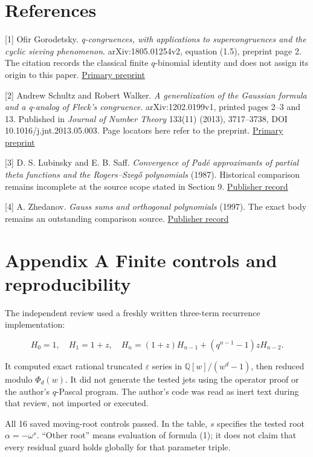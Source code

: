 \documentclass[
  11pt,
]{article}
\begin{document}
\section{References}\label{references}

{[}1{]} Ofir Gorodetsky. \emph{q-congruences, with applications to
supercongruences and the cyclic sieving phenomenon}. arXiv:1805.01254v2,
equation (1.5), preprint page 2. The citation records the classical
finite \(q\)-binomial identity and does not assign its origin to this
paper. \href{https://arxiv.org/pdf/1805.01254v2}{Primary preprint}

{[}2{]} Andrew Schultz and Robert Walker. \emph{A generalization of the
Gaussian formula and a q-analog of Fleck's congruence}.
arXiv:1202.0199v1, printed pages 2--3 and 13. Published in \emph{Journal
of Number Theory} 133(11) (2013), 3717--3738, DOI
10.1016/j.jnt.2013.05.003. Page locators here refer to the preprint.
\href{https://arxiv.org/pdf/1202.0199v1}{Primary preprint}

{[}3{]} D. S. Lubinsky and E. B. Saff. \emph{Convergence of Padé
approximants of partial theta functions and the Rogers--Szegő
polynomials} (1987). Historical comparison remains incomplete at the
source scope stated in Section 9.
\href{https://doi.org/10.1007/BF01890574}{Publisher record}

{[}4{]} A. Zhedanov. \emph{Gauss sums and orthogonal polynomials}
(1997). The exact body remains an outstanding comparison source.
\href{https://doi.org/10.1142/S0217751X97000438}{Publisher record}

\section{Appendix A Finite controls and
reproducibility}\label{appendix-a-finite-controls-and-reproducibility}

The independent review used a freshly written three-term recurrence
implementation:

\[
H_0=1,\quad H_1=1+z,\quad
H_n=(1+z)H_{n-1}+(q^{n-1}-1)zH_{n-2}.
\]

It computed exact rational truncated \(\varepsilon\) series in
\(\mathbb Q[w]/(w^d-1)\), then reduced modulo \(\Phi_d(w)\). It did not
generate the tested jets using the operator proof or the author's
\(q\)-Pascal program. The author's code was read as inert text during
that review, not imported or executed.

All 16 saved moving-root controls passed. In the table, \(s\) specifies
the tested root \(\alpha=-\omega^s\). ``Other root'' means evaluation of
formula (1); it does not claim that every residual guard holds globally
for that parameter triple.
\end{document}

